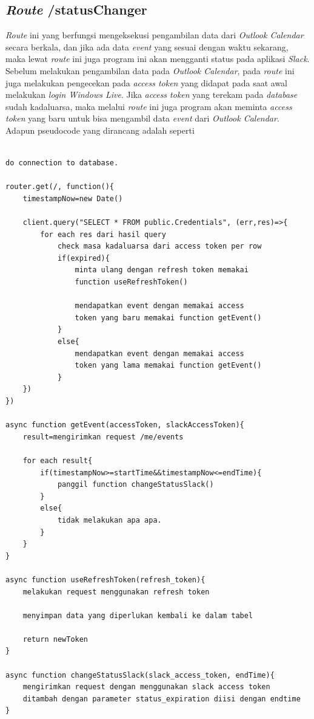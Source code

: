 \subsection{\textit{Route} /statusChanger}
\textit{Route} ini yang berfungsi mengeksekusi pengambilan data dari \textit{Outlook Calendar} secara berkala, dan jika ada data \textit{event} yang sesuai dengan waktu sekarang, maka lewat \textit{route} ini juga program ini akan mengganti status pada aplikasi \textit{Slack}. Sebelum melakukan pengambilan data pada \textit{Outlook Calendar}, pada \textit{route} ini juga melakukan pengecekan pada \textit{access token} yang didapat pada saat awal melakukan \textit{login Windows Live}. Jika \textit{access token} yang terekam pada \textit{database} sudah kadaluarsa, maka melalui \textit{route} ini juga program akan meminta \textit{access token} yang baru untuk bisa mengambil data \textit{event} dari \textit{Outlook Calendar}. Adapun pseudocode yang dirancang adalah seperti\\
\\

\begin{lstlisting}[caption={Pseudocode untuk /statusChanger}, label={code:pseudocode_statusChanger}]
do connection to database. 

router.get(/, function(){
    timestampNow=new Date()
    
    client.query("SELECT * FROM public.Credentials", (err,res)=>{
        for each res dari hasil query
            check masa kadaluarsa dari access token per row
            if(expired){
                minta ulang dengan refresh token memakai
                function useRefreshToken()
                
                mendapatkan event dengan memakai access
                token yang baru memakai function getEvent()
            }
            else{
                mendapatkan event dengan memakai access
                token yang lama memakai function getEvent()
            }
    })
})

async function getEvent(accessToken, slackAccessToken){
    result=mengirimkan request /me/events
    
    for each result{
        if(timestampNow>=startTime&&timestampNow<=endTime){
            panggil function changeStatusSlack()
        }
        else{
            tidak melakukan apa apa. 
        }
    }
}

async function useRefreshToken(refresh_token){
    melakukan request menggunakan refresh token
    
    menyimpan data yang diperlukan kembali ke dalam tabel 
    
    return newToken
}

async function changeStatusSlack(slack_access_token, endTime){
    mengirimkan request dengan menggunakan slack access token
    ditambah dengan parameter status_expiration diisi dengan endtime
}

\end{lstlisting}


